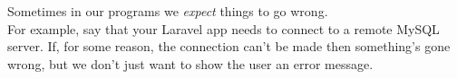 Sometimes in our programs we \textit{expect} things to go wrong.
\\

For example, say that your Laravel app needs to connect to a remote MySQL server. If, for some reason, the connection can't be made then something's gone wrong, but we don't just want to show the user an error message.
